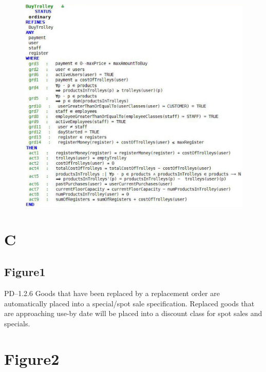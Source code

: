 \begin{figure}[htbp]
\centering
\includegraphics[keepaspectratio,width=\textwidth,height=0.75\textheight]{3.jpg}
\label{}
\end{figure}


 \pagebreak 

\section{C}
\label{c}

\subsection{Figure1}
\label{figure1}

PD--1.2.6 Goods that have been replaced by a replacement order are automatically placed into a special\slash spot sale specification.
Replaced goods that are approaching use-by date will be placed into a discount class for spot sales and specials.

\section{Figure2}
\label{figure2}

